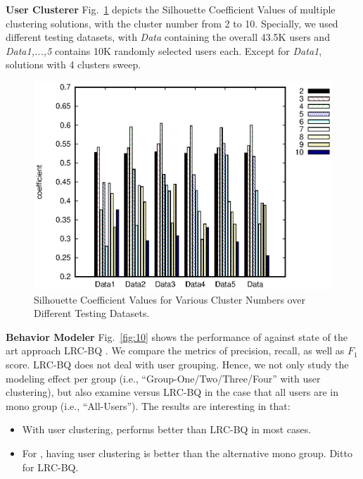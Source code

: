 \textbf{User Clusterer}
%
Fig.\ \ref{fig:uc} depicts the Silhouette Coefficient Values of multiple clustering solutions, with the cluster number from 2 to 10.
Specially, we used different testing datasets, with \textit{Data} containing the overall 43.5K users and \textit{Data1,...,5} contains 10K randomly selected users each.
Except for \textit{Data1}, solutions with 4 clusters sweep.

\begin{figure}[!htb]
\centering
\includegraphics[width=.85\linewidth]{figures/clustering}
\caption{Silhouette Coefficient Values for Various Cluster Numbers over Different Testing Datasets.}
\label{fig:uc}
\end{figure}


\textbf{Behavior Modeler}
%
Fig.\ \ref{fig:10} shows the performance of \sys{} against state of the art approach LRC-BQ \cite{IEEEexample:conf/ijcai/ZhangLTCL13}.
We compare the metrics of precision, recall, as well as $F_1$ score.
LRC-BQ does not deal with user grouping.
Hence, we not only study the modeling effect per group (i.e., ``Group-One/Two/Three/Four'' with user clustering), but also examine \sys{} versus LRC-BQ in the case that all users are in mono group (i.e., ``All-Users'').
The results are interesting in that:
\begin{itemize}
	\item With user clustering, \sys{} performs better than LRC-BQ in most cases.
	\item For \sys{}, having user clustering is better than the alternative mono group. Ditto for LRC-BQ.
\end{itemize}



